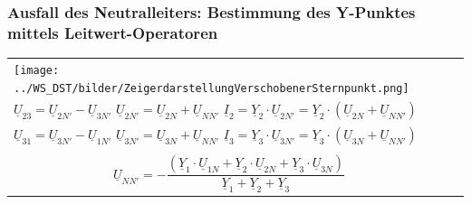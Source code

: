        \renewcommand{\arraystretch}{1}
		
        \subsubsection{Ausfall des Neutralleiters: Bestimmung des Y-Punktes mittels Leitwert-Operatoren}
            \begin{tabular}{p{5cm}p{13cm}}
            	\begin{minipage}{8cm}
                	\texttt{[image: ../WS\_DST/bilder/ZeigerdarstellungVerschobenerSternpunkt.png]}
                \end{minipage} &
				\begin{minipage}{13cm}
                	$\underline{U}_{12} = \underline{U}_{1N'} - \underline{U}_{2N'}$ \hspace{0.3cm}
                	$\underline{U}_{1N'} = \underline{U}_{1N} + \underline{U}_{NN'}$ \hspace{0.3cm}
                	$\underline{I}_1 = \underline{Y}_1 \cdot \underline{U}_{1N'} = \underline{Y}_1 \cdot (\underline{U}_{1N} + \underline{U}_{NN'})$ \\
                	$\underline{U}_{23} = \underline{U}_{2N'} - \underline{U}_{3N'}$ \hspace{0.3cm}
                	$\underline{U}_{2N'} = \underline{U}_{2N} + \underline{U}_{NN'}$ \hspace{0.3cm}
                	$\underline{I}_2 = \underline{Y}_2 \cdot \underline{U}_{2N'} = \underline{Y}_2
                	\cdot (\underline{U}_{2N} + \underline{U}_{NN'})$ \\ $\underline{U}_{31} = \underline{U}_{3N'} - \underline{U}_{1N'}$ \hspace{0.3cm}
                	$\underline{U}_{3N'} = \underline{U}_{3N} + \underline{U}_{NN'}$ \hspace{0.3cm}
                	$\underline{I}_3 = \underline{Y}_3 \cdot \underline{U}_{3N'} = \underline{Y}_3
                	\cdot (\underline{U}_{3N} + \underline{U}_{NN'})$ \\ \\ 
                	$$\underline{U}_{NN'} = \boldsymbol{-} \frac{(\underline{Y}_1 \cdot
                	\underline{U}_{1N} + \underline{Y}_2 \cdot \underline{U}_{2N} + \underline{Y}_3 \cdot
                	\underline{U}_{3N})}{\underline{Y}_1 + \underline{Y}_2 +
                	\underline{Y}_3}$$
                \end{minipage}
			\end{tabular}

